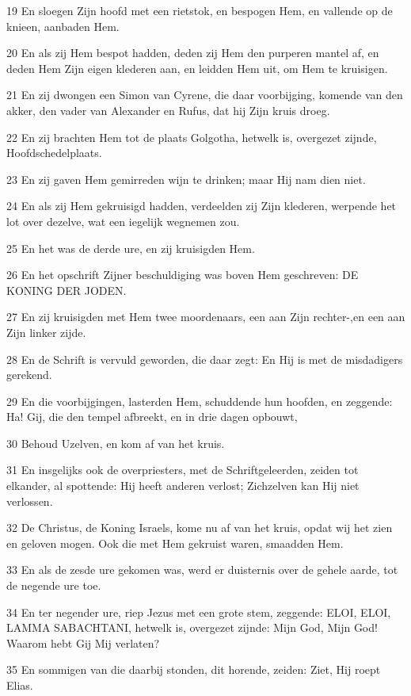 \par 19 En sloegen Zijn hoofd met een rietstok, en bespogen Hem, en vallende op de knieen, aanbaden Hem.
\par 20 En als zij Hem bespot hadden, deden zij Hem den purperen mantel af, en deden Hem Zijn eigen klederen aan, en leidden Hem uit, om Hem te kruisigen.
\par 21 En zij dwongen een Simon van Cyrene, die daar voorbijging, komende van den akker, den vader van Alexander en Rufus, dat hij Zijn kruis droeg.
\par 22 En zij brachten Hem tot de plaats Golgotha, hetwelk is, overgezet zijnde, Hoofdschedelplaats.
\par 23 En zij gaven Hem gemirreden wijn te drinken; maar Hij nam dien niet.
\par 24 En als zij Hem gekruisigd hadden, verdeelden zij Zijn klederen, werpende het lot over dezelve, wat een iegelijk wegnemen zou.
\par 25 En het was de derde ure, en zij kruisigden Hem.
\par 26 En het opschrift Zijner beschuldiging was boven Hem geschreven: DE KONING DER JODEN.
\par 27 En zij kruisigden met Hem twee moordenaars, een aan Zijn rechter-,en een aan Zijn linker zijde.
\par 28 En de Schrift is vervuld geworden, die daar zegt: En Hij is met de misdadigers gerekend.
\par 29 En die voorbijgingen, lasterden Hem, schuddende hun hoofden, en zeggende: Ha! Gij, die den tempel afbreekt, en in drie dagen opbouwt,
\par 30 Behoud Uzelven, en kom af van het kruis.
\par 31 En insgelijks ook de overpriesters, met de Schriftgeleerden, zeiden tot elkander, al spottende: Hij heeft anderen verlost; Zichzelven kan Hij niet verlossen.
\par 32 De Christus, de Koning Israels, kome nu af van het kruis, opdat wij het zien en geloven mogen. Ook die met Hem gekruist waren, smaadden Hem.
\par 33 En als de zesde ure gekomen was, werd er duisternis over de gehele aarde, tot de negende ure toe.
\par 34 En ter negender ure, riep Jezus met een grote stem, zeggende: ELOI, ELOI, LAMMA SABACHTANI, hetwelk is, overgezet zijnde: Mijn God, Mijn God! Waarom hebt Gij Mij verlaten?
\par 35 En sommigen van die daarbij stonden, dit horende, zeiden: Ziet, Hij roept Elias.
